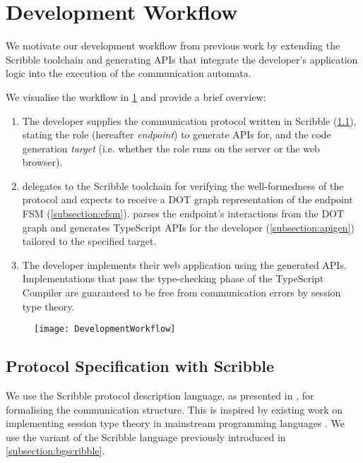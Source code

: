 \section{Development Workflow}

We motivate our development workflow from previous work 
\cite{PureScript2019, Hybrid2016} by extending the Scribble toolchain
and generating APIs that integrate the developer's 
application logic
into the execution of the communication automata.

We visualise the workflow in \cref{fig:devworkflow} 
and provide a brief overview:

\begin{enumerate}

\item The developer supplies the communication protocol written in
Scribble (\cref{subsection:scribble}), 
stating the role (hereafter \textit{endpoint})
to generate APIs for,
and the code generation \textit{target}
(i.e. whether the role runs on the server or the web browser).

\item {} delegates to the 
Scribble toolchain for verifying the well-formedness of
the protocol and expects to receive a DOT graph representation of
the endpoint FSM (\cref{subsection:efsm}). 
 parses the endpoint's 
interactions from the DOT graph and generates TypeScript APIs
for the developer (\cref{subsection:apigen}) 
tailored to the specified target.

\item The developer implements their web application using the
generated APIs. Implementations that pass the type-checking phase
of the TypeScript Compiler are guaranteed to be free from 
communication errors by session type theory.

\end{enumerate}

\begin{figure}[!ht]
\centering
\texttt{[image: DevelopmentWorkflow]}
\label{fig:devworkflow}
\end{figure}

\subsection{Protocol Specification with Scribble}
\label{subsection:scribble}

We use the Scribble protocol description language, 
as presented in
\cite{Scribble}, for formalising the communication structure. This is
inspired by existing work on implementing session type theory 
in mainstream programming languages
\cite{Hybrid2016, PureScript2019, Python2017}. 
We use the variant of the Scribble language 
previously introduced in \cref{subsection:bgscribble}.

